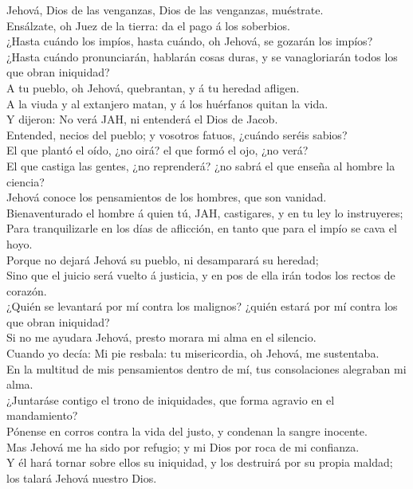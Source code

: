  Jehová, Dios de las venganzas, Dios de las venganzas,
muéstrate.\\
 Ensálzate, oh Juez de la tierra: da el pago á los
soberbios.\\
 ¿Hasta cuándo los impíos, hasta cuándo, oh Jehová, se
gozarán los impíos?\\
 ¿Hasta cuándo pronunciarán, hablarán cosas duras, y se
vanagloriarán todos los que obran iniquidad?\\
 A tu pueblo, oh Jehová, quebrantan, y á tu heredad
afligen.\\
 A la viuda y al extanjero matan, y á los huérfanos quitan
la vida.\\
 Y dijeron: No verá JAH, ni entenderá el Dios de Jacob.\\
 Entended, necios del pueblo; y vosotros fatuos, ¿cuándo
seréis sabios?\\
 El que plantó el oído, ¿no oirá? el que formó el ojo, ¿no
verá?\\
 El que castiga las gentes, ¿no reprenderá? ¿no sabrá el
que enseña al hombre la ciencia?\\
 Jehová conoce los pensamientos de los hombres, que son
vanidad.\\
 Bienaventurado el hombre á quien tú, JAH, castigares, y en
tu ley lo instruyeres;\\
 Para tranquilizarle en los días de aflicción, en tanto que
para el impío se cava el hoyo.\\
 Porque no dejará Jehová su pueblo, ni desamparará su
heredad;\\
 Sino que el juicio será vuelto á justicia, y en pos de
ella irán todos los rectos de corazón.\\
 ¿Quién se levantará por mí contra los malignos? ¿quién
estará por mí contra los que obran iniquidad?\\
 Si no me ayudara Jehová, presto morara mi alma en el
silencio.\\
 Cuando yo decía: Mi pie resbala: tu misericordia, oh
Jehová, me sustentaba.\\
 En la multitud de mis pensamientos dentro de mí, tus
consolaciones alegraban mi alma.\\
 ¿Juntaráse contigo el trono de iniquidades, que forma
agravio en el mandamiento?\\
 Pónense en corros contra la vida del justo, y condenan la
sangre inocente.\\
 Mas Jehová me ha sido por refugio; y mi Dios por roca de
mi confianza.\\
 Y él hará tornar sobre ellos su iniquidad, y los destruirá
por su propia maldad; los talará Jehová nuestro Dios.

